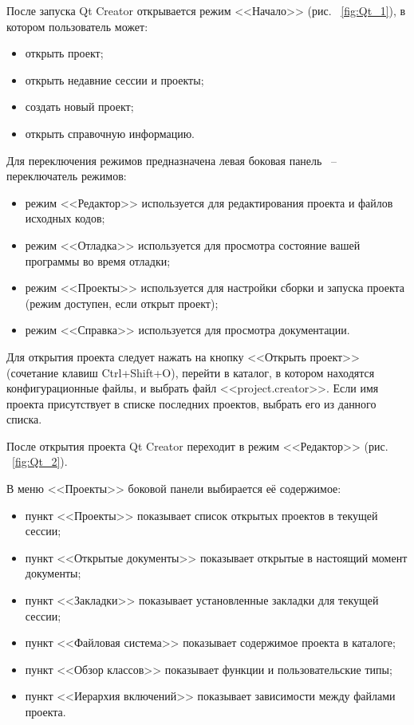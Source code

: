 После запуска Qt Creator открывается режим <<Начало>> (рис. ~\ref{fig:Qt_1}), в котором пользователь может:
\begin{itemize}
\item открыть проект;  
\item открыть недавние сессии и проекты;  
\item создать новый проект;
\item открыть справочную информацию. \killoverfullbefore 
\end{itemize}


Для переключения режимов предназначена левая боковая панель ~-- переключатель режимов:
\begin{itemize}
\item режим <<Редактор>> используется для редактирования проекта и файлов исходных кодов;
\item режим <<Отладка>> используется для просмотра состояние вашей программы во время отладки;
\item режим <<Проекты>> используется для настройки сборки и запуска проекта (режим доступен, если открыт проект);
\item режим <<Справка>> используется для просмотра документации.\killoverfullbefore \BL
\end{itemize}

Для открытия проекта следует нажать на кнопку <<Открыть проект>> (сочетание клавиш Ctrl+Shift+O), перейти в каталог, в котором находятся конфигурационные файлы, и выбрать файл <<project.creator>>. Если имя проекта присутствует в списке последних проектов, выбрать его из данного списка.


После открытия проекта Qt Creator переходит в режим <<Редактор>> (рис. ~\ref{fig:Qt_2}).


В меню <<Проекты>> боковой панели выбирается её содержимое:
\begin{itemize}
\item пункт <<Проекты>> показывает список открытых проектов в текущей сессии;
\item пункт <<Открытые документы>> показывает открытые в настоящий момент документы;
\item пункт <<Закладки>> показывает установленные закладки для текущей сессии;
\item пункт <<Файловая система>> показывает содержимое проекта в каталоге;
\item пункт <<Обзор классов>> показывает функции и пользовательские типы;
\item пункт <<Иерархия включений>> показывает зависимости между файлами проекта. \killoverfullbefore \BL
\end{itemize}

